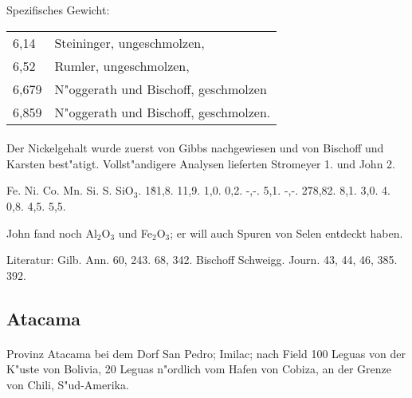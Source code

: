 \documentclass[a4paper, 11pt, oneside]{article}
\begin{document}
Spezifisches Gewicht:  
\begin{table}[!ht]
    \centering
    \begin{tabular}{l l}
        6,14 & Steininger, ungeschmolzen,\\
        6,52 & Rumler, ungeschmolzen,\\
        6,679 & N"oggerath und Bischoff, geschmolzen\\
        6,859 & N"oggerath und Bischoff, geschmolzen.
    \end{tabular}
\end{table}
\paragraph{}
Der Nickelgehalt wurde zuerst von Gibbs nachgewiesen und von Bischoff und Karsten best"atigt. Vollst"andigere Analysen lieferten Stromeyer 1. und John 2.

Fe. Ni. Co. Mn. Si. S. SiO$_{3}$.  
1\. 81,8. 11,9. 1,0. 0,2. -,-. 5,1. -,-.  
2\. 78,82. 8,1. 3,0. 4. 0,8. 4,5. 5,5.

John fand noch Al$_{2}$O$_{3}$ und Fe$_{2}$O$_{3}$; er will auch Spuren von Selen entdeckt haben.

\footnotesize
Literatur: Gilb. Ann. 60, 243. 68, 342. Bischoff Schweigg. Journ. 43, 44, 46, 385. 392.

\subsection{Atacama}
\normalsize
\paragraph{}
Provinz Atacama bei dem Dorf San Pedro; Imilac; nach Field 100 Leguas von der K"uste von Bolivia, 20 Leguas n"ordlich vom Hafen von Cobiza, an der Grenze von Chili, S"ud-Amerika.
\end{document}
